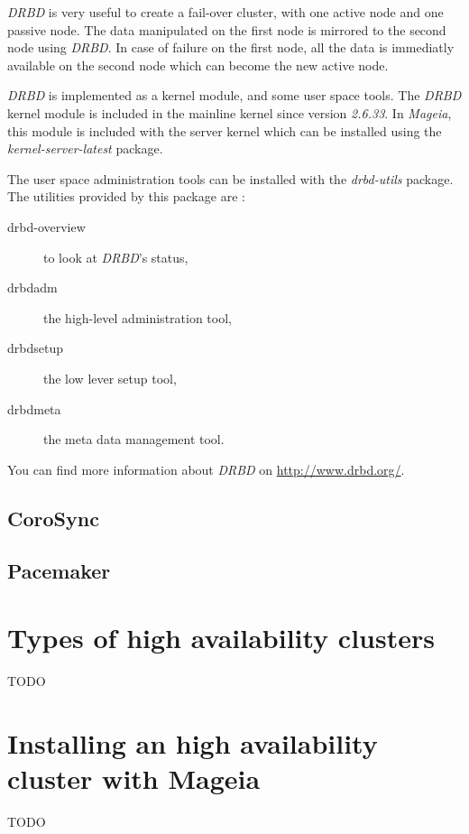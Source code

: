 \documentclass[a4paper,12pt]{article}
\begin{document}
\emph{DRBD} is very useful to create a fail-over cluster, with one
active node and one passive node. The data manipulated on the first
node is mirrored to the second node using \emph{DRBD}. In case of
failure on the first node, all the data is immediatly available on the
second node which can become the new active node.

\emph{DRBD} is implemented as a kernel module, and some user space tools.
The \emph{DRBD} kernel module is included in the mainline kernel since
version \emph{2.6.33}. In \emph{Mageia}, this module is included with
the server kernel which can be installed using the
\emph{kernel-server-latest} package.

The user space administration tools can be installed with the \emph{drbd-utils}
package. The utilities provided by this package are :
\begin{description}
\item[drbd-overview] to look at \emph{DRBD}'s status,
\item[drbdadm] the high-level administration tool,
\item[drbdsetup] the low lever setup tool,
\item[drbdmeta] the meta data management tool.
\end{description}

You can find more information about \emph{DRBD} on \url{http://www.drbd.org/}.

\subsection{CoroSync}
\subsection{Pacemaker}

\cleardoublepage
\section{Types of high availability clusters}
TODO

\cleardoublepage
\section{Installing an high availability cluster with Mageia}
TODO

\cleardoublepage
\end{document}
